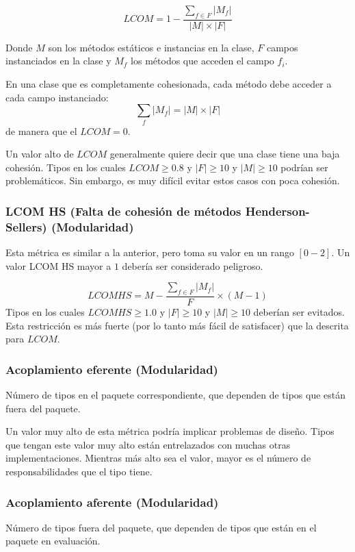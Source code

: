 \begin{equation*}
LCOM = 1 - \frac{\sum_{f\in F}\left|M_f\right|}{\left|M\right|\times\left|F\right|}
\end{equation*}

Donde $M$ son los métodos estáticos e instancias en la clase, $F$ campos instanciados en la clase y $M_f$ 
los métodos que acceden el campo $f_i$.

En una clase que es completamente cohesionada, cada método debe acceder a cada campo instanciado:
\begin{equation*}
\sum_f \left|M_f\right| = \left|M\right|\times\left|F\right|
\end{equation*}
de manera que el $LCOM=0$.

Un valor alto de $LCOM$ generalmente quiere decir que una clase tiene una baja cohesión. Tipos en los cuales
$LCOM\ge 0.8$ y $\left|F\right|\ge 10$ y $\left|M\right|\ge 10$ podrían ser problemáticos. Sin embargo, es 
muy difícil evitar estos casos con poca cohesión.

\subsubsection{LCOM HS (Falta de cohesión de métodos Henderson-Sellers) (Modularidad)}
Esta métrica es similar a la anterior, pero toma su valor en un rango $\left[ 0-2\right]$. Un valor LCOM 
HS mayor a $1$ debería ser considerado peligroso.

\begin{equation*}
LCOM HS = M - \frac{\sum_{f\in F}\left|M_f\right|}{F}\times (M-1)
\end{equation*}
Tipos en los cuales $LCOM HS\ge 1.0$ y $\left|F\right|\ge 10$ y $\left|M\right|\ge 10$ deberían ser evitados. 
Esta restricción es más fuerte (por lo tanto más fácil de satisfacer) que la descrita para $LCOM$.

\subsubsection{Acoplamiento eferente (Modularidad)}
Número de tipos en el paquete correspondiente, que dependen de tipos que están fuera del paquete.

Un valor muy alto de esta métrica podría implicar problemas de diseño. Tipos que tengan este valor muy 
alto están entrelazados con muchas otras implementaciones. Mientras más alto sea el valor, mayor es el número  
de responsabilidades que el tipo tiene.

\subsubsection{Acoplamiento aferente (Modularidad)}
Número de tipos fuera del paquete, que dependen de tipos que están en el paquete en evaluación. 


